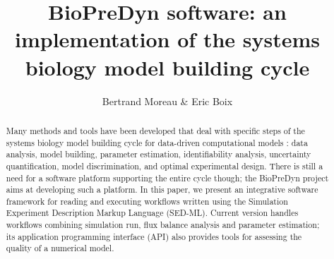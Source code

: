 \documentclass[portrait,a1,usenames,dvipsnames]{sciposter}
\begin{document}
\title{BioPreDyn software: an implementation of the systems biology model
building cycle}
\author{Bertrand Moreau \& Eric Boix}
\maketitle

\begin{abstract}
Many methods and tools have been developed that deal with specific steps of
the systems biology model building cycle for data-driven computational models
\cite{Kitano2002}: data analysis, model building, parameter estimation,
identifiability analysis, uncertainty quantification, model discrimination, and
optimal experimental design. There is still a need for a software platform
supporting the entire cycle though; the BioPreDyn project aims at developing
such a platform. In this paper, we present an integrative software framework
for reading and executing workflows written using the Simulation Experiment
Description Markup Language (SED-ML). Current version handles workflows
combining simulation run, flux balance analysis and parameter estimation; its
application programming interface (API) also provides tools for assessing the
quality of a numerical model.
\end{abstract}
\end{document}
